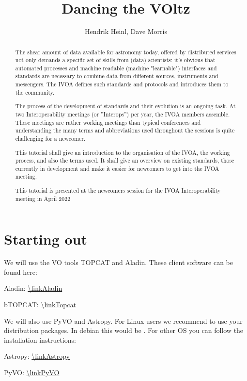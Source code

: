 \documentclass[twoside]{article}[12pt]
\title {Dancing the VOltz}
\author {Hendrik Heinl, Dave Morris}
\begin{document}
\maketitle 
 
\pagebreak
\begin {abstract}
The shear amount of data available for astronomy today, offered by
distributed services not only demands a specific set of skills from
(data) scientists: it's obvious that automated processes and machine
readable (machine "learnable") interfaces and standards are necessary to
combine data from different sources, instruments and messengers. The
IVOA defines such standards and protocols and introduces them to the
community. 

The process of the development of standards and their evolution is an
ongoing task. At two Interoperability meetings (or ''Interops'') per
year, the IVOA members assemble. These meetings are rather working
meetings than typical conferences and understanding the many terms and
abbreviations used throughout the sessions is quite challenging for a
newcomer.  

This tutorial shall give an introduction to the organisation of the
IVOA, the working process, and also the terms used. It shall give an
overview on existing standards, those currently in development and make
it easier for newcomers to get into the IVOA meeting.

This tutorial is presented at the newcomers session for the IVOA
Interoperability meeting in April 2022\end{abstract}



\section{Starting out}
We will use the VO tools TOPCAT and Aladin. These client
software can be found here:

Aladin: \url{\linkAladin}

bTOPCAT: \url{\linkTopcat}

We will also use PyVO and Astropy. For Linux users we recommend to use
your distribution packages. In debian this would be 
. For other OS you can
follow the installation instructions:

Astropy: \url{\linkAstropy}

PyVO: \url{\linkPyVO}
\end{document}
